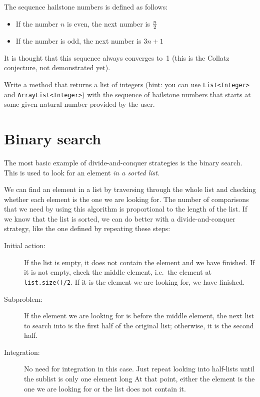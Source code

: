 \documentclass{article}
\begin{document}
The sequence hailstone numbers is defined as follows:

\begin{itemize}
\item If the number $n$ is even, the next number is $n \over 2$
\item If the number is odd, the next number is $3n + 1$
\end{itemize}

It is thought that this sequence always converges 
to~1 (this is the Collatz conjecture,
not demonstrated yet). 

Write a method that returns a list of integers
(hint: you can use \verb+List<Integer>+ and \verb+ArrayList<Integer>+) 
with the sequence of hailstone numbers that starts at some
given natural number provided by the user. 

\section{Binary search}
\label{sec:binary-search}

The most basic example of divide-and-conquer strategies is the binary
search. This is used to look for an element \emph{in a sorted list}. 

We can find an element in a list by traversing through the whole list
and checking whether each element is the one we are looking for. The
number of comparisons that we need by using this algorithm is
proportional to the length of the list. If we know that the list is
sorted, we can do better with a divide-and-conquer strategy, 
like the one defined by repeating these steps: 

\begin{description}
\item[Initial action: ] If the list is empty, it does not contain the
  element and we have finished. 
  If it is not empty, check the middle element, i.e.~the
  element at \verb+list.size()/2+. If it is the element we are looking
  for, we have finished. 
\item[Subproblem: ] If the element we are looking for is before the
  middle element, the next list to search into is the first half of
  the original list; otherwise, it is the second half.
\item[Integration: ] No need for integration in this case. Just repeat
  looking into half-lists until the sublist is only one element long 
  At that point, either the element is the one we are looking for or
  the list does not contain it. 
\end{description}
\end{document}

